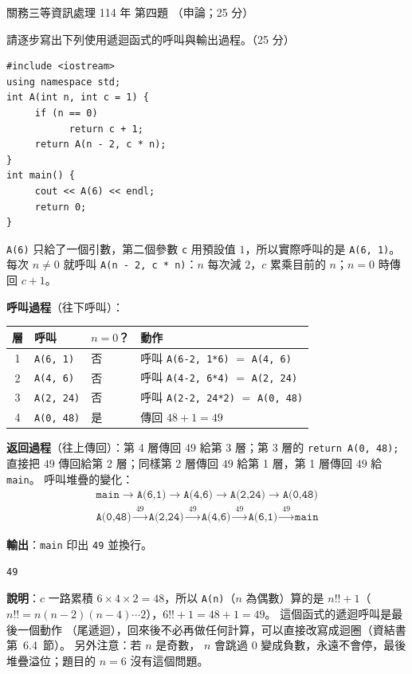 \begin{pastexam}[label={px:gw3-114-ds-04}]{關務三等資訊處理 114 年 第四題}
（申論；25 分）

請逐步寫出下列使用遞迴函式的呼叫與輸出過程。（25 分）
\begin{verbatim}
#include <iostream>
using namespace std;
int A(int n, int c = 1) {
     if (n == 0)
           return c + 1;
     return A(n - 2, c * n);
}
int main() {
     cout << A(6) << endl;
     return 0;
}
\end{verbatim}
\end{pastexam}

\begin{pastsoln}
\texttt{A(6)} 只給了一個引數，第二個參數 \texttt{c} 用預設值 $1$，所以實際呼叫的是 \texttt{A(6, 1)}。 每次
$n \ne 0$ 就呼叫 \texttt{A(n - 2, c * n)}：$n$ 每次減 $2$，$c$ 累乘目前的 $n$；$n = 0$ 時傳回 $c + 1$。

\textbf{呼叫過程}（往下呼叫）：
\begin{center}
\begin{tabular}{clll}
\toprule
層 & 呼叫 & $n = 0$？ & 動作 \\
\midrule
1 & \texttt{A(6, 1)} & 否 & 呼叫 \texttt{A(6-2, 1*6)} $=$ \texttt{A(4, 6)} \\
2 & \texttt{A(4, 6)} & 否 & 呼叫 \texttt{A(4-2, 6*4)} $=$ \texttt{A(2, 24)} \\
3 & \texttt{A(2, 24)} & 否 & 呼叫 \texttt{A(2-2, 24*2)} $=$ \texttt{A(0, 48)} \\
4 & \texttt{A(0, 48)} & 是 & 傳回 $48 + 1 = 49$ \\
\bottomrule
\end{tabular}
\end{center}

\textbf{返回過程}（往上傳回）：第 4 層傳回 $49$ 給第 3 層；第 3 層的 \texttt{return A(0, 48);} 直接把
$49$ 傳回給第 2 層；同樣第 2 層傳回 $49$ 給第 1 層，第 1 層傳回 $49$ 給 \texttt{main}。 呼叫堆疊的變化：
\begin{gather*}
\texttt{main} \to \texttt{A(6,1)} \to \texttt{A(4,6)} \to \texttt{A(2,24)} \to \texttt{A(0,48)} \\
\texttt{A(0,48)} \xrightarrow{\ 49\ } \texttt{A(2,24)} \xrightarrow{\ 49\ } \texttt{A(4,6)}
\xrightarrow{\ 49\ } \texttt{A(6,1)} \xrightarrow{\ 49\ } \texttt{main}
\end{gather*}

\textbf{輸出}：\texttt{main} 印出 \texttt{49} 並換行。
\begin{verbatim}
49
\end{verbatim}

\textbf{說明}：$c$ 一路累積 $6 \times 4 \times 2 = 48$，所以 \texttt{A(n)}（$n$ 為偶數）算的是
$n!! + 1$（$n!! = n(n-2)(n-4)\cdots 2$），$6!! + 1 = 48 + 1 = 49$。 這個函式的遞迴呼叫是最後一個動作
（尾遞迴），回來後不必再做任何計算，可以直接改寫成迴圈（資結書第~6.4~節）。 另外注意：若 $n$ 是奇數，
$n$ 會跳過 $0$ 變成負數，永遠不會停，最後堆疊溢位；題目的 $n = 6$ 沒有這個問題。
\end{pastsoln}
